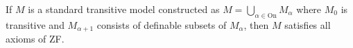 If $M$ is a standard transitive model constructed as $M = \bigcup_{\alpha \in \mathrm{On}} M_\alpha$ where $M_0$ is transitive and $M_{\alpha+1}$ consists of definable subsets of $M_\alpha$, then $M$ satisfies all axioms of ZF.
